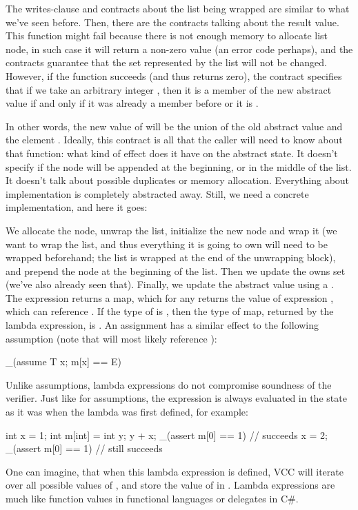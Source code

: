 
\noindent
The writes-clause and contracts about the list being wrapped are similar to what
we've seen before.
Then, there are the contracts talking about the result value.
This function might fail because there is not enough memory to allocate list node,
in such case it will return a non-zero value (an error code perhaps),
and the contracts guarantee that the set represented by the list will not be changed.
However, if the function succeeds (and thus returns zero), the contract specifies
that if we take an arbitrary integer , then it is a member of the new abstract
value if and only if it was already a member before or it is .

In other words, the new value of  will be the union of the old
abstract value and the element .
Ideally, this contract is all that the caller will need to know about that function:
what kind of effect does it have on the abstract state. 
It doesn't specify if the node will be appended at the beginning, or in the middle
of the list.
It doesn't talk about possible duplicates or memory allocation.
Everything about implementation is completely abstracted away.
Still, we need a concrete implementation, and here it goes:


\noindent
We allocate the node, unwrap the list, initialize the new node
and wrap it (we want to wrap the list, and thus everything it is going to own will
need to be wrapped beforehand; the list is wrapped at the end of the 
unwrapping block), and
prepend the node at the beginning of the list.
Then we update the owns set (we've also already seen that).
Finally, we update the abstract value using a .
The expression  returns a map, which for
any  returns the value of expression ,
which can reference .
If the type of  is , then the type of map, returned by the
lambda expression, is .
An assignment  has a similar effect to
the following assumption (note that  will most likely reference ):
\begin{VCC}
_(assume \forall T x; m[x] == E)
\end{VCC}
\noindent
Unlike assumptions, lambda expressions do not compromise 
soundness of the verifier.
Just like for assumptions,
the expression is always evaluated in the state as it was
when the lambda was first defined, for example:
\begin{VCC}
int x = 1;
int m[int] = \lambda int y; y + x;
_(assert m[0] == 1) // succeeds
x = 2;
_(assert m[0] == 1) // still succeeds
\end{VCC}
One can imagine, that when this lambda expression is defined,
VCC will iterate over all possible values of ,
and store the value of  in .
Lambda expressions are much like function values in functional
languages or delegates in C\#.

